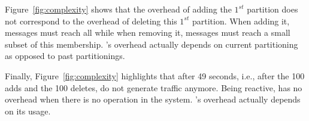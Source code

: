 \begin{asparadesc}
\noindent Figure~\ref{fig:complexity} shows that the overhead of
adding the $1^{st}$ partition does not correspond to the overhead of
deleting this $1^{st}$ partition. When adding it, messages must reach
all \processes while when removing it, messages must reach a small
subset of this membership.  \NAME's overhead actually depends on
current partitioning as opposed to past partitionings.

\noindent Finally, Figure~\ref{fig:complexity} highlights that after
49 seconds, i.e., after the 100 adds and the 100 deletes, \processes
do not generate traffic anymore. Being reactive, \NAME has no overhead
when there is no operation in the system. \NAME's overhead actually
depends on its usage.

\end{asparadesc}




